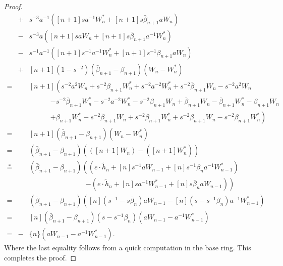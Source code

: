 \begin{proof}
\begin{eqnarray*}
&+& s^{-3}a^{-1}\left( [n+1]sa^{-1}W^*_n + [n+1]s\bar{\beta}_{n+1}aW_n \right) \\
&-&s^{-3}a\left( [n+1]saW_n + [n+1]s\bar{\beta}_{n+1}a^{-1}W^*_n \right) \\
&-& s^{-1}a^{-1}\left( [n+1]s^{-1}a^{-1}W^*_n + [n+1]s^{-1}\beta_{n+1}aW_n \right) \\
&+& [n+1]\left(1-s^{-2} \right) \left( \bar{\beta}_{n+1} - \beta_{n+1} \right) \left( W_n - W^*_n \right)\\
=&& [n+1]\left( s^{-2}a^2W_n + s^{-2}\beta_{n+1}W^*_n + s^{-2}a^{-2}W^*_n + s^{-2}\bar{\beta}_{n+1}W_n - s^{-2}a^{2}W_n \right. \\
&&\qquad\quad \left. - s^{-2}\bar{\beta}_{n+1}W^*_n - s^{-2}a^{-2}W^*_n - s^{-2}\beta_{n+1}W_n + \bar{\beta}_{n+1}W_n - \bar{\beta}_{n+1}W^*_n - \beta_{n+1}W_n \right. \\
&&\qquad\quad \left. + \beta_{n+1}W^*_n - s^{-2}\bar{\beta}_{n+1}W_n + s^{-2}\bar{\beta}_{n+1}W^*_n + s^{-2}\beta_{n+1}W_n - s^{-2}\beta_{n+1}W^*_n \right) \\
=&& [n+1]\left( \bar{\beta}_{n+1} - \beta_{n+1} \right) \left( W_n - W^*_n \right) \\
=&& \left( \bar{\beta}_{n+1} - \beta_{n+1} \right) \left( \left( [n+1]W_n \right) - \left( [n+1]W^*_n \right) \right) \\
\overset{\ast}{=}&& \left( \bar{\beta}_{n+1} - \beta_{n+1} \right) \left( \left( e \cdot \tilde{h}_{n} + [n]s^{-1}aW_{n-1} + [n]s^{-1}\beta_{n}a^{-1}W^*_{n-1} \right) \right. \\
&& \qquad\qquad\qquad\qquad \left. -\left( e \cdot \tilde{h}_{n} + [n]sa^{-1}W^*_{n-1} + [n]s\bar{\beta}_{n}aW_{n-1} \right) \right) \\
=&& \left( \bar{\beta}_{n+1} - \beta_{n+1} \right) \left( [n]\left( s^{-1} - s\bar{\beta}_{n} \right) aW_{n-1} - [n]\left( s-s^{-1}\beta_{n} \right) a^{-1}W^*_{n-1} \right) \\
=&& [n]\left(\bar{\beta}_{n+1} - \beta_{n+1} \right) \left( s - s^{-1}\beta_{n} \right) \left( aW_{n-1} - a^{-1}W^*_{n-1} \right) \\
=&-& \{n\}\left( aW_{n-1} - a^{-1}W^*_{n-1} \right).
\end{eqnarray*}
Where the last equality follows from a quick computation in the base ring. This completes the proof.
\end{proof}

